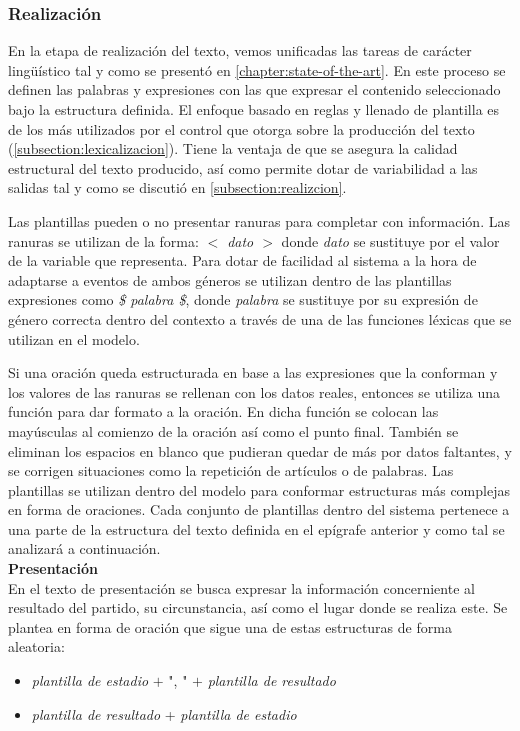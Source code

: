 \subsubsection{Realización}

    En la etapa de realización del texto, vemos unificadas las tareas de carácter lingüístico tal y como se presentó en \ref{chapter:state-of-the-art}. 
En este proceso se definen las palabras y expresiones con las que expresar el contenido seleccionado bajo la estructura definida. El enfoque basado en reglas 
y llenado de plantilla es de los más utilizados por el control que otorga sobre la producción del texto (\ref{subsection:lexicalizacion}). Tiene la ventaja de que 
se asegura la calidad estructural del texto producido, así como permite dotar de variabilidad a las salidas tal y como se discutió en \ref{subsection:realizcion}.

    Las plantillas pueden o no presentar ranuras para completar con información. Las ranuras se utilizan de la forma: \textit{$<$ dato $>$} donde 
\textit{dato} se sustituye por el valor de la variable que representa. Para dotar de facilidad al sistema a la hora de adaptarse a eventos de 
ambos géneros se utilizan dentro de las plantillas expresiones como \textit{\$ palabra \$}, donde \textit{palabra} se sustituye por su expresión de 
género correcta dentro del contexto a través de una de las funciones léxicas que se utilizan en el modelo. 

    Si una oración queda estructurada en base a las expresiones que la conforman y los valores de las ranuras se rellenan con los datos reales, entonces 
se utiliza una función para dar formato a la oración. En dicha función se colocan las mayúsculas al comienzo de la oración así como el punto final. También se 
eliminan los espacios en blanco que pudieran quedar de más por datos faltantes, y se corrigen situaciones como la repetición de artículos o de palabras.
    Las plantillas se utilizan dentro del modelo para conformar estructuras más complejas en forma de 
oraciones. Cada conjunto de plantillas dentro del sistema pertenece a una parte de la estructura del texto definida en el ep\'igrafe anterior y como 
tal se analizará a continuación.\\

    \textbf{Presentación}\\

    En el texto de presentación se busca expresar la información concerniente al resultado del partido, su circunstancia, así como el lugar donde se 
realiza este. Se plantea en forma de oración que sigue una de estas estructuras de forma aleatoria:
    \begin{itemize}
        \item \textit{plantilla de estadio} $+$ ", " $+$ \textit{plantilla de resultado}
        \item \textit{plantilla de resultado} + \textit{plantilla de estadio}
    \end{itemize}
        
